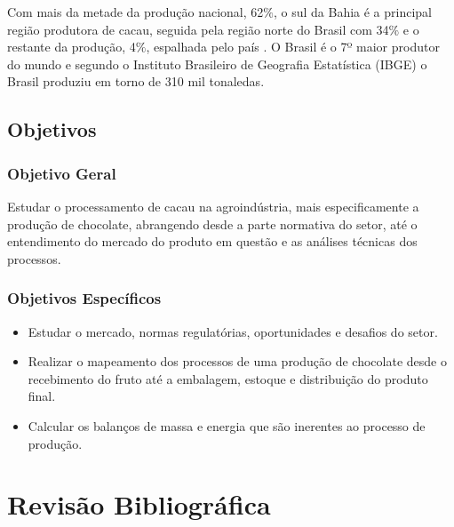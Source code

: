 \documentclass[
	12pt,				%
	openright,			%
	oneside,			%
	a4paper,			%
	english,			%
	french,				%
	spanish,			%
	brazil				%
	]{abntex2}
\begin{document}
Com mais da metade da produção nacional, 62$\%$, o sul da Bahia é a principal região produtora de cacau, seguida pela região norte do Brasil com 34$\%$ e o restante da produção, 4$\%$, espalhada pelo país \cite{1}. O Brasil é o 7º maior produtor do mundo e segundo o Instituto Brasileiro de Geografia Estatística (IBGE) o Brasil produziu em torno de 310 mil tonaledas. \cite{3} 


\section{Objetivos}

\subsection{Objetivo Geral}

Estudar o processamento de cacau na agroindústria, mais especificamente a produção de chocolate, abrangendo desde a parte normativa do setor, até o entendimento do mercado do produto em questão e as análises técnicas dos processos.

\subsection{Objetivos Específicos}

\begin{itemize}
\item Estudar o mercado, normas regulatórias, oportunidades e desafios do setor.
\item Realizar o mapeamento dos processos de uma produção de chocolate desde o recebimento do fruto até a embalagem, estoque e distribuição do produto final.
\item Calcular os balanços de massa e energia que são inerentes ao processo de produção.
\end{itemize}

\newpage
\chapter{Revisão Bibliográfica}

\end{document}
